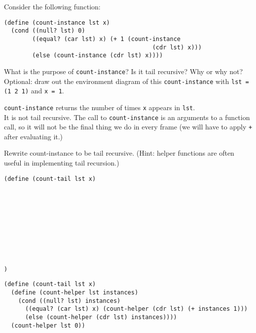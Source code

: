 \begin{blocksection}
\question Consider the following function:

\begin{lstlisting}
(define (count-instance lst x)
  (cond ((null? lst) 0)
        ((equal? (car lst) x) (+ 1 (count-instance
                                          (cdr lst) x)))
        (else (count-instance (cdr lst) x))))
\end{lstlisting}

\vspace{2\baselineskip}

What is the purpose of \texttt{count-instance}? Is it tail recursive? Why or why not?
\newline
Optional: draw out the environment diagram of this \texttt{count-instance} with \texttt{lst = (1 2 1)} and \texttt{x = 1}.

\begin{solution}[0.5in]
\texttt{count-instance} returns the number of times \texttt{x} appears in \texttt{lst}.
\\It is not tail recursive. The call to \texttt{count-instance} is an arguments to a function call, so it will not be the final thing we do in every frame (we will have to apply \texttt{+} after evaluating it.)
\end{solution}


\question Rewrite count-instance to be tail recursive. (Hint: helper functions are often useful in implementing tail recursion.)

\begin{lstlisting}
(define (count-tail lst x)










)
\end{lstlisting}

\begin{solution}[0.5in]
\begin{lstlisting}
(define (count-tail lst x)
  (define (count-helper lst instances)
    (cond ((null? lst) instances)
      ((equal? (car lst) x) (count-helper (cdr lst) (+ instances 1)))
      (else (count-helper (cdr lst) instances))))
  (count-helper lst 0))
\end{lstlisting}
\end{solution}
\end{blocksection}

